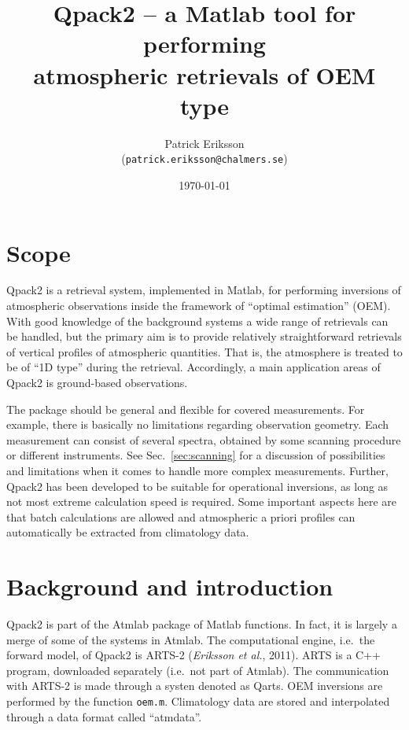 \documentclass[a4paper,11pt]{article}
\title{Qpack2 -- a Matlab tool for performing\\atmospheric 
       retrievals of OEM type}
\author{Patrick Eriksson\\(\texttt{patrick.eriksson@chalmers.se})}
\date{\today}
\begin{document}
\maketitle

\section{Scope}
\label{sec:scope}
Qpack2 is a retrieval system, implemented in Matlab, for performing inversions
of atmospheric observations inside the framework of ``optimal estimation''
(OEM). With good knowledge of the background systems a wide range of retrievals
can be handled, but the primary aim is to provide relatively
straightforward retrievals of vertical profiles of atmospheric quantities. That
is, the atmosphere is treated to be of ``1D type'' during the retrieval.
Accordingly, a main application areas of Qpack2 is ground-based observations.

The package should be general and flexible for covered measurements. For
example, there is basically no limitations regarding observation geometry. Each
measurement can consist of several spectra, obtained by some scanning procedure
or different instruments. See Sec.~\ref{sec:scanning} for a discussion of
possibilities and limitations when it comes to handle more complex
measurements. Further, Qpack2 has been developed to be suitable for operational
inversions, as long as not most extreme calculation speed is required. Some
important aspects here are that batch calculations are allowed and atmospheric
a priori profiles can automatically be extracted from climatology data.



\section{Background and introduction}
\label{sec:background}
Qpack2 is part of the Atmlab package of Matlab functions. In fact, it is
largely a merge of some of the systems in Atmlab. The computational engine,
i.e.\ the forward model, of Qpack2 is ARTS-2 ({\it Eriksson et al.}, 2011).
ARTS is a C++ program, downloaded separately (i.e.\ not part of Atmlab). The
communication with ARTS-2 is made through a systen denoted as Qarts. OEM
inversions are performed by the function \verb|oem.m|. Climatology data are
stored and interpolated through a data format called ``atmdata''.
\end{document}
